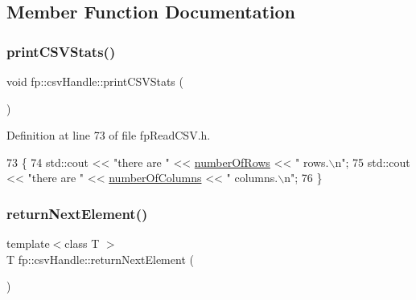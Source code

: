 \subsection{Member Function Documentation}
\mbox{\label{classfp_1_1csvHandle_a92b24e693a4add05786e266c9b5cbc62}} 
\subsubsection{\texorpdfstring{print\+C\+S\+V\+Stats()}{printCSVStats()}}
{\footnotesize\ttfamily void fp\+::csv\+Handle\+::print\+C\+S\+V\+Stats (\begin{DoxyParamCaption}{ }\end{DoxyParamCaption})\hspace{0.3cm}{\ttfamily [inline]}}



Definition at line 73 of file fp\+Read\+C\+S\+V.\+h.


\begin{DoxyCode}
73                                 \{
74                 std::cout << \textcolor{stringliteral}{"there are "} << \hyperlink{classfp_1_1csvHandle_a07cf6b14355c5fa81643a7bb6e9c681f}{numberOfRows} << \textcolor{stringliteral}{" rows.\(\backslash\)n"};
75                 std::cout << \textcolor{stringliteral}{"there are "} << \hyperlink{classfp_1_1csvHandle_ae3e5280846df348d0b1b86b78f2e3682}{numberOfColumns} << \textcolor{stringliteral}{" columns.\(\backslash\)n"};
76             \}
\end{DoxyCode}
\mbox{\label{classfp_1_1csvHandle_a1368fb87fa52c457ef15e1b9903529c4}} 
\subsubsection{\texorpdfstring{return\+Next\+Element()}{returnNextElement()}}
{\footnotesize\ttfamily template$<$class T $>$ \\
T fp\+::csv\+Handle\+::return\+Next\+Element (\begin{DoxyParamCaption}{ }\end{DoxyParamCaption})\hspace{0.3cm}{\ttfamily [inline]}}



